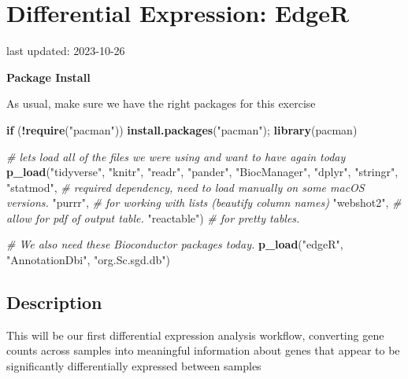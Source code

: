\documentclass[
]{book}
\newenvironment{Shaded}{\begin{snugshade}}{\end{snugshade}}
\newcommand{\CommentTok}[1]{\textcolor[rgb]{0.56,0.35,0.01}{\textit{#1}}}
\newcommand{\ControlFlowTok}[1]{\textcolor[rgb]{0.13,0.29,0.53}{\textbf{#1}}}
\newcommand{\FunctionTok}[1]{\textcolor[rgb]{0.13,0.29,0.53}{\textbf{#1}}}
\newcommand{\NormalTok}[1]{#1}
\newcommand{\SpecialCharTok}[1]{\textcolor[rgb]{0.81,0.36,0.00}{\textbf{#1}}}
\newcommand{\StringTok}[1]{\textcolor[rgb]{0.31,0.60,0.02}{#1}}
\begin{document}
\hypertarget{differential-expression-edger}{%
\chapter{Differential Expression: EdgeR}\label{differential-expression-edger}}

last updated: 2023-10-26

\textbf{Package Install}

As usual, make sure we have the right packages for this exercise

\begin{Shaded}
\begin{Highlighting}[]
\ControlFlowTok{if}\NormalTok{ (}\SpecialCharTok{!}\FunctionTok{require}\NormalTok{(}\StringTok{"pacman"}\NormalTok{)) }\FunctionTok{install.packages}\NormalTok{(}\StringTok{"pacman"}\NormalTok{); }\FunctionTok{library}\NormalTok{(pacman)}

\CommentTok{\# let\textquotesingle{}s load all of the files we were using and want to have again today}
\FunctionTok{p\_load}\NormalTok{(}\StringTok{"tidyverse"}\NormalTok{, }\StringTok{"knitr"}\NormalTok{, }\StringTok{"readr"}\NormalTok{,}
       \StringTok{"pander"}\NormalTok{, }\StringTok{"BiocManager"}\NormalTok{, }
       \StringTok{"dplyr"}\NormalTok{, }\StringTok{"stringr"}\NormalTok{, }
       \StringTok{"statmod"}\NormalTok{, }\CommentTok{\# required dependency, need to load manually on some macOS versions.}
       \StringTok{"purrr"}\NormalTok{, }\CommentTok{\# for working with lists (beautify column names)}
       \StringTok{"webshot2"}\NormalTok{, }\CommentTok{\# allow for pdf of output table.}
       \StringTok{"reactable"}\NormalTok{) }\CommentTok{\# for pretty tables.}

\CommentTok{\# We also need these Bioconductor packages today.}
\FunctionTok{p\_load}\NormalTok{(}\StringTok{"edgeR"}\NormalTok{, }\StringTok{"AnnotationDbi"}\NormalTok{, }\StringTok{"org.Sc.sgd.db"}\NormalTok{)}
\end{Highlighting}
\end{Shaded}

\hypertarget{description-2}{%
\section{Description}\label{description-2}}

This will be our first differential expression analysis workflow,
converting gene counts across samples into meaningful information about
genes that appear to be significantly differentially expressed between
samples
\end{document}
